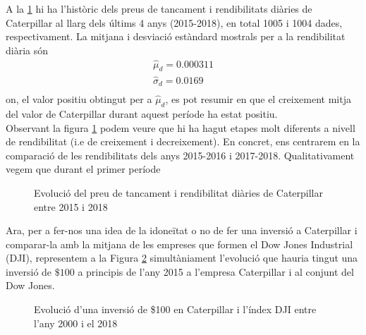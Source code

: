 \documentclass{article}
\numberwithin{table}{section}
\numberwithin{figure}{section}
\numberwithin{equation}{section}
\begin{document}
A la \ref{fig:serie preus} hi ha l'històric dels preus de tancament i rendibilitats diàries de Caterpillar al llarg dels últims 4 anys (2015-2018), en total 1005 i 1004 dades, respectivament. La mitjana i desviació estàndard mostrals per a la rendibilitat diària són
\begin{equation} \label{eq:parametres}
	\begin{gathered}
		\hat{\mu}_d = 0.000311 \\
		\hat{\sigma}_d	= 0.0169 \\
	\end{gathered}
\end{equation}
on, el valor positiu obtingut per a $\hat{\mu}_d$, es pot resumir en que el creixement mitja del valor de Caterpillar durant aquest període ha estat positiu.\\

Observant la figura \ref{fig:serie preus} podem veure que hi ha hagut etapes molt diferents a nivell de rendibilitat (i.e de creixement i decreixement). En concret, ens centrarem en la comparació de les rendibilitats dels anys 2015-2016 i 2017-2018.
Qualitativament vegem que durant el primer període 





\begin{figure}[htb]
	\centering \sffamily \small
	
	\caption{Evolució del preu de tancament i rendibilitat diàries de Caterpillar entre 2015 i 2018}
	\label{fig:serie preus}
\end{figure}

Ara, per a fer-nos una idea de la idoneïtat o no de fer una inversió a Caterpillar i comparar-la amb la mitjana de les empreses que formen el Dow Jones Industrial (DJI), representem a la Figura \ref{fig:inversio} simultàniament l'evolució que hauria tingut una inversió de $\$100$ a principis de l'any 2015 a l'empresa Caterpillar i al conjunt del Dow Jones.
\begin{figure}[H]
	\centering \sffamily \small
	
	\caption{Evolució d'una inversió de \$100 en Caterpillar i l'índex DJI entre l'any 2000 i el 2018}
	\label{fig:inversio}
\end{figure}
\end{document}
